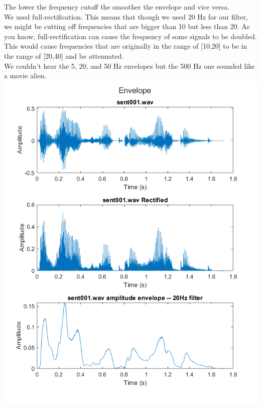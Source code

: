 \documentclass[11pt]{article}
\begin{document}
The lower the frequency cutoff the smoother the envelope and vice versa.\\

We used full-rectification.
This means that though we used 20 Hz for our filter, we might be cutting off frequencies that are bigger than 10 but less than 20.
As you know, full-rectification can cause the frequency of some signals to be doubled.
This would cause frequencies that are originally in the range of [10,20] to be in the range of [20,40] and be attenuated.\\

We couldn't hear the 5, 20, and 50 Hz envelopes but the 500 Hz one sounded like a movie alien.\\



\includegraphics[width=\textwidth]{exercise4.png}
\end{document}

